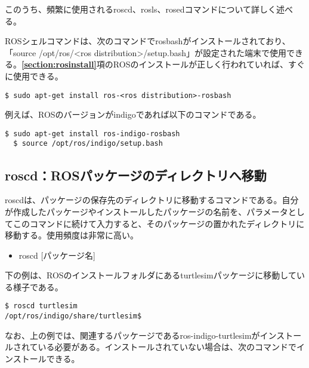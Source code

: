 このうち、頻繁に使用されるroscd、rosls、rosedコマンドについて詳しく述べる。\\

\begin{exercise}[ROSシェルコマンドを使用できる環境]
    ROSシェルコマンドは、次のコマンドでrosbashがインストールされており、「source /opt/ros/<ros distribution>/setup.bash」が設定された端末で使用できる。\textbf{\ref{section:rosinstall}}項のROSのインストールが正しく行われていれば、すぐに使用できる。
  \begin{lstlisting}[language=ROS]
  $ sudo apt-get install ros-<ros distribution>-rosbash
  \end{lstlisting}
  例えば、ROSのバージョンがindigoであれば以下のコマンドである。
  \begin{lstlisting}[language=ROS]
  $ sudo apt-get install ros-indigo-rosbash
  $ source /opt/ros/indigo/setup.bash
  \end{lstlisting}
\end{exercise}

\subsection{roscd：ROSパッケージのディレクトリへ移動}

roscdは、パッケージの保存先のディレクトリに移動するコマンドである。自分が作成したパッケージやインストールしたパッケージの名前を、パラメータとしてこのコマンドに続けて入力すると、そのパッケージの置かれたディレクトリに移動する。使用頻度は非常に高い。\\

\begin{itemize}
\item roscd [パッケージ名]\\
\end{itemize}

下の例は、ROSのインストールフォルダにあるturtlesimパッケージに移動している様子である。

\begin{lstlisting}[language=ROS]
$ roscd turtlesim
/opt/ros/indigo/share/turtlesim$
\end{lstlisting}

なお、上の例では、関連するパッケージであるros-indigo-turtlesimがインストールされている必要がある。インストールされていない場合は、次のコマンドでインストールできる。\\

